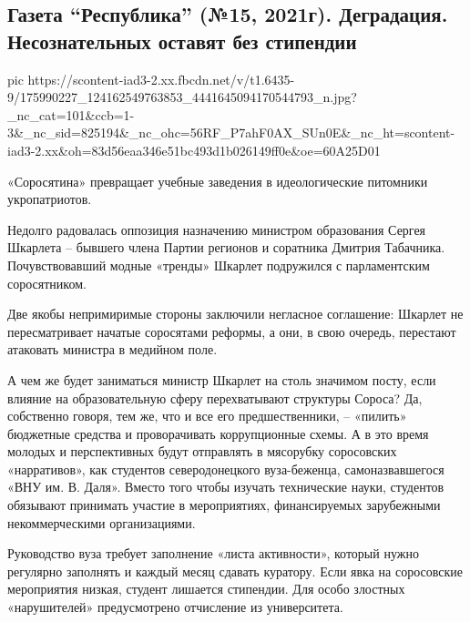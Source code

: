  
 
 
 
 
\subsection{Газета \enquote{Республика} (№15, 2021г).  Деградация.  Несознательных оставят без стипендии}

\ifcmt
  pic https://scontent-iad3-2.xx.fbcdn.net/v/t1.6435-9/175990227_124162549763853_4441645094170544793_n.jpg?_nc_cat=101&ccb=1-3&_nc_sid=825194&_nc_ohc=56RF_P7ahF0AX_SUn0E&_nc_ht=scontent-iad3-2.xx&oh=83d56eaa346e51bc493d1b026149ff0e&oe=60A25D01
\fi

«Соросятина» превращает учебные заведения в идеологические питомники укропатриотов.

Недолго радовалась оппозиция назначению министром образования Сергея Шкарлета –
бывшего члена Партии регионов и соратника Дмитрия Табачника. Почувствовавший
модные «тренды» Шкарлет подружился с парламентским соросятником.

Две якобы непримиримые стороны заключили негласное соглашение: Шкарлет не
пересматривает начатые соросятами реформы, а они, в свою очередь, перестают
атаковать министра в медийном поле. 

А чем же будет заниматься министр Шкарлет на столь значимом посту, если влияние
на образовательную сферу перехватывают структуры Сороса? Да, собственно говоря,
тем же, что и все его предшественники, – «пилить» бюджетные средства и
проворачивать коррупционные схемы. А в это время молодых и перспективных будут
отправлять в мясорубку соросовских «нарративов», как студентов северодонецкого
вуза-беженца, самоназвавшегося «ВНУ им. В. Даля». Вместо того чтобы изучать
технические науки, студентов обязывают принимать участие в мероприятиях,
финансируемых зарубежными некоммерческими организациями. 

Руководство вуза требует заполнение «листа активности», который нужно регулярно
заполнять и каждый месяц сдавать куратору. Если явка на соросовские мероприятия
низкая, студент лишается стипендии. Для особо злостных «нарушителей»
предусмотрено отчисление из университета.

